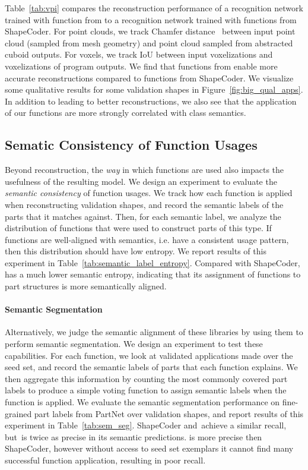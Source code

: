 Table~\ref{tab:vpi} compares the reconstruction performance of a recognition network trained with function from \methodname to a recognition network trained with functions from ShapeCoder.
For point clouds, we track Chamfer distance~\cite{fan2017point} between input point cloud (sampled from mesh geometry) and point cloud sampled from abstracted cuboid outputs. 
For voxels, we track IoU between input voxelizations and voxelizations of program outputs. 
We find that functions from \methodname enable more accurate reconstructions compared to functions from ShapeCoder.
We visualize some qualitative results for some validation shapes in Figure~\ref{fig:big_qual_apps}. In addition to leading to better reconstructions, we also see that the application of our functions are more strongly correlated with class semantics.


\subsection{Sematic Consistency of Function Usages} 
\label{sec:res_semantics}



Beyond reconstruction, the \textit{way} in which functions are used also impacts the usefulness of the resulting model.
We design an experiment to evaluate the \textit{semantic consistency} of function usages.
We track how each function is applied when reconstructing validation shapes, and record the semantic labels of the parts that it matches against. 
Then, for each semantic label, we analyze the distribution of functions that were used to construct parts of this type. 
If functions are well-aligned with semantics,
i.e. have a consistent usage pattern,
then this distribution should have low entropy.
We report results of this experiment in Table~\ref{tab:semantic_label_entropy}. 
Compared with ShapeCoder, \methodname has a much lower semantic entropy, indicating that its assignment of functions to part structures is more semantically aligned.

\paragraph{Semantic Segmentation}

Alternatively, we judge the semantic alignment of these libraries by using them to perform semantic segmentation.
We design an experiment to test these capabilities.
For each function, we look at validated applications made over the seed set, and record the semantic labels of parts that each function explains. 
We then aggregate this information by counting the most commonly covered part labels to produce a simple voting function to assign semantic labels when the function is applied.
We evaluate the semantic segmentation performance on fine-grained part labels from PartNet over validation shapes, and report results of this experiment in Table~\ref{tab:sem_seg}.
ShapeCoder and~\methodname achieve a similar recall, but~\methodname is twice as precise in its semantic predictions.
\llmbaseline is more precise then ShapeCoder,
however without access to seed set exemplars it cannot find many successful function application, resulting in poor recall.


